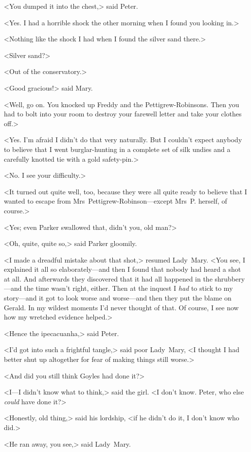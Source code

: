 <You dumped it into the chest,> said Peter.

<Yes. I had a horrible shock the other morning when I found you looking in.>

<Nothing like the shock I had when I found the silver sand there.>

<Silver sand?>

<Out of the conservatory.>

<Good gracious!> said Mary.

<Well, go on. You knocked up Freddy and the Pettigrew-Robinsons. Then you had to bolt into your room to destroy your farewell letter and take your clothes off.>

<Yes. I'm afraid I didn't do that very naturally. But I couldn't expect anybody to believe that I went burglar-hunting in a complete set of silk undies and a carefully knotted tie with a gold safety-pin.>

<No. I see your difficulty.>

<It turned out quite well, too, because they were all quite ready to believe that I wanted to escape from Mrs~Pettigrew-Robinson—except Mrs~P\@. herself, of course.>

<Yes; even Parker swallowed that, didn't you, old man?>

<Oh, quite, quite so,> said Parker gloomily.

<I made a dreadful mistake about that shot,> resumed Lady~Mary. <You see, I explained it all so elaborately—and then I found that nobody had heard a shot at all. And afterwards they discovered that it had all happened in the shrubbery—and the time wasn't right, either. Then at the inquest I \emph{had} to stick to my story—and it got to look worse and worse—and then they put the blame on Gerald. In my wildest moments I'd never thought of that. Of course, I see now how my wretched evidence helped.>

<Hence the ipecacuanha,> said Peter.

<I'd got into such a frightful tangle,> said poor Lady~Mary, <I thought I had better shut up altogether for fear of making things still worse.>

<And did you still think Goyles had done it?>

<I—I didn't know what to think,> said the girl. <I don't know. Peter, who else \emph{could} have done it?>

<Honestly, old thing,> said his lordship, <if he didn't do it, I don't know who did.>

<He ran away, you see,> said Lady~Mary.

